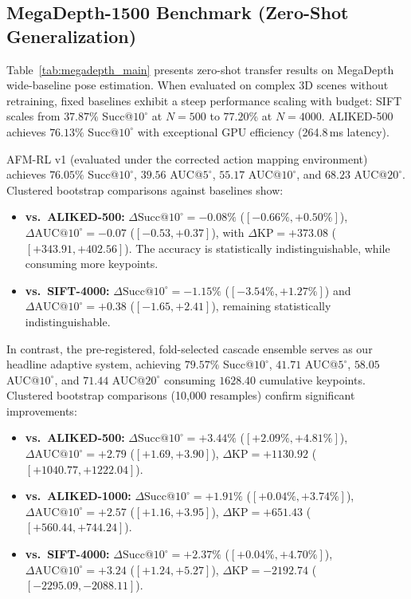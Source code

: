 \documentclass[conference]{IEEEtran}
\begin{document}
\subsection{MegaDepth-1500 Benchmark (Zero-Shot Generalization)}
Table~\ref{tab:megadepth_main} presents zero-shot transfer results on MegaDepth wide-baseline pose estimation. When evaluated on complex 3D scenes without retraining, fixed baselines exhibit a steep performance scaling with budget: SIFT scales from $37.87\%$ Succ@$10^\circ$ at $N=500$ to $77.20\%$ at $N=4000$. ALIKED-500 achieves $76.13\%$ Succ@$10^\circ$ with exceptional GPU efficiency (264.8\,ms latency).

AFM-RL v1 (evaluated under the corrected action mapping environment) achieves $76.05\%$ Succ@$10^\circ$, $39.56$ AUC@$5^\circ$, $55.17$ AUC@$10^\circ$, and $68.23$ AUC@$20^\circ$. Clustered bootstrap comparisons against baselines show:
\begin{itemize}
    \item \textbf{vs.\ ALIKED-500:} $\Delta\text{Succ}@10^\circ = -0.08\%$ ($[-0.66\%, +0.50\%]$), $\Delta\text{AUC}@10^\circ = -0.07$ ($[-0.53, +0.37]$), with $\Delta\text{KP} = +373.08$ ($[+343.91, +402.56]$). The accuracy is statistically indistinguishable, while consuming more keypoints.
    \item \textbf{vs.\ SIFT-4000:} $\Delta\text{Succ}@10^\circ = -1.15\%$ ($[-3.54\%, +1.27\%]$) and $\Delta\text{AUC}@10^\circ = +0.38$ ($[-1.65, +2.41]$), remaining statistically indistinguishable.
\end{itemize}

In contrast, the pre-registered, fold-selected cascade ensemble serves as our headline adaptive system, achieving $79.57\%$ Succ@$10^\circ$, $41.71$ AUC@$5^\circ$, $58.05$ AUC@$10^\circ$, and $71.44$ AUC@$20^\circ$ consuming $1628.40$ cumulative keypoints. Clustered bootstrap comparisons (10,000 resamples) confirm significant improvements:
\begin{itemize}
    \item \textbf{vs.\ ALIKED-500:} $\Delta\text{Succ}@10^\circ = +3.44\%$ ($[+2.09\%, +4.81\%]$), $\Delta\text{AUC}@10^\circ = +2.79$ ($[+1.69, +3.90]$), $\Delta\text{KP} = +1130.92$ ($[+1040.77, +1222.04]$).
    \item \textbf{vs.\ ALIKED-1000:} $\Delta\text{Succ}@10^\circ = +1.91\%$ ($[+0.04\%, +3.74\%]$), $\Delta\text{AUC}@10^\circ = +2.57$ ($[+1.16, +3.95]$), $\Delta\text{KP} = +651.43$ ($[+560.44, +744.24]$).
    \item \textbf{vs.\ SIFT-4000:} $\Delta\text{Succ}@10^\circ = +2.37\%$ ($[+0.04\%, +4.70\%]$), $\Delta\text{AUC}@10^\circ = +3.24$ ($[+1.24, +5.27]$), $\Delta\text{KP} = -2192.74$ ($[-2295.09, -2088.11]$).
\end{itemize}
\end{document}
